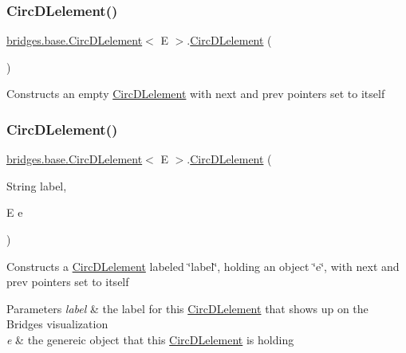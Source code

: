 \subsubsection{\texorpdfstring{Circ\+D\+Lelement()}{CircDLelement()}\hspace{0.1cm}{\footnotesize\ttfamily [1/4]}}
{\footnotesize\ttfamily \hyperlink{classbridges_1_1base_1_1_circ_d_lelement}{bridges.\+base.\+Circ\+D\+Lelement}$<$ E $>$.\hyperlink{classbridges_1_1base_1_1_circ_d_lelement}{Circ\+D\+Lelement} (\begin{DoxyParamCaption}{ }\end{DoxyParamCaption})}

Constructs an empty \hyperlink{classbridges_1_1base_1_1_circ_d_lelement}{Circ\+D\+Lelement} with next and prev pointers set to itself \hypertarget{classbridges_1_1base_1_1_circ_d_lelement_a84b2ebf47d2ca24077a800b240d8d157}{}\label{classbridges_1_1base_1_1_circ_d_lelement_a84b2ebf47d2ca24077a800b240d8d157} 
\subsubsection{\texorpdfstring{Circ\+D\+Lelement()}{CircDLelement()}\hspace{0.1cm}{\footnotesize\ttfamily [2/4]}}
{\footnotesize\ttfamily \hyperlink{classbridges_1_1base_1_1_circ_d_lelement}{bridges.\+base.\+Circ\+D\+Lelement}$<$ E $>$.\hyperlink{classbridges_1_1base_1_1_circ_d_lelement}{Circ\+D\+Lelement} (\begin{DoxyParamCaption}\item[{String}]{label,  }\item[{E}]{e }\end{DoxyParamCaption})}

Constructs a \hyperlink{classbridges_1_1base_1_1_circ_d_lelement}{Circ\+D\+Lelement} labeled \char`\"{}label\char`\"{}, holding an object \char`\"{}e\char`\"{}, with next and prev pointers set to itself


\begin{DoxyParams}{Parameters}
{\em label} & the label for this \hyperlink{classbridges_1_1base_1_1_circ_d_lelement}{Circ\+D\+Lelement} that shows up on the Bridges visualization \\
\hline
{\em e} & the genereic object that this \hyperlink{classbridges_1_1base_1_1_circ_d_lelement}{Circ\+D\+Lelement} is holding \\
\hline
\end{DoxyParams}
\hypertarget{classbridges_1_1base_1_1_circ_d_lelement_a98a471fc3225ed80595e1ffdb377e336}{}\label{classbridges_1_1base_1_1_circ_d_lelement_a98a471fc3225ed80595e1ffdb377e336} 
